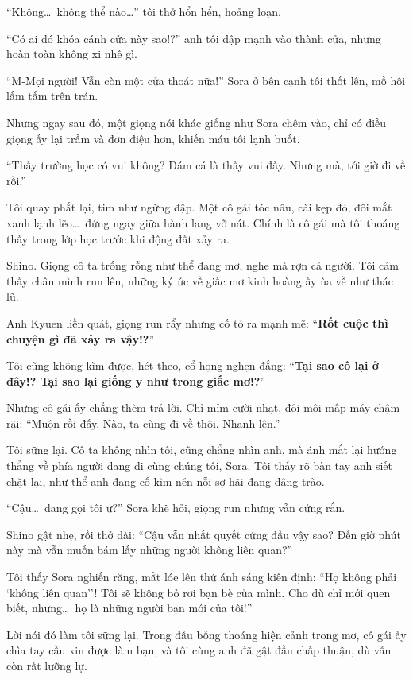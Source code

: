 \documentclass[../main.tex]{subfiles}
\begin{document}
``Không\dots\ không thể nào\dots'' tôi thở hổn hển, hoảng loạn.

``Có ai đó khóa cánh cửa này sao!?'' anh tôi đập mạnh vào thành cửa, nhưng hoàn toàn không xi nhê gì.

``M-Mọi người! Vẫn còn một cửa thoát nữa!'' Sora ở bên cạnh tôi thốt lên, mồ hôi lấm tấm trên trán.

Nhưng ngay sau đó, một giọng nói khác giống như Sora chêm vào, chỉ có điều giọng ấy lại trầm và đơn điệu hơn, khiến máu tôi lạnh buốt.


``Thấy trường học có vui không? Dám cá là thấy vui đấy. Nhưng mà, tới giờ đi về rồi.''

Tôi quay phắt lại, tim như ngừng đập. Một cô gái tóc nâu, cài kẹp đỏ, đôi mắt xanh lạnh lẽo\dots\ đứng ngay giữa hành lang vỡ nát. Chính là cô gái mà tôi thoáng thấy trong lớp học trước khi động đất xảy ra.

Shino. Giọng cô ta trống rỗng như thể đang mơ, nghe mà rợn cả người. Tôi cảm thấy chân mình run lên, những ký ức về giấc mơ kinh hoàng ấy ùa về như thác lũ.

Anh Kyuen liền quát, giọng run rẩy nhưng cố tỏ ra mạnh mẽ: ``\textbf{Rốt cuộc thì chuyện gì đã xảy ra vậy!?}''

Tôi cũng không kìm được, hét theo, cổ họng nghẹn đắng: ``\textbf{Tại sao cô lại ở đây!? Tại sao lại giống y như trong giấc mơ!?}''

Nhưng cô gái ấy chẳng thèm trả lời. Chỉ mỉm cười nhạt, đôi môi mấp máy chậm rãi: ``Muộn rồi đấy. Nào, ta cùng đi về thôi. Nhanh lên.''

Tôi sững lại. Cô ta không nhìn tôi, cũng chẳng nhìn anh, mà ánh mắt lại hướng thẳng về phía người đang đi cùng chúng tôi, Sora. Tôi thấy rõ bàn tay anh siết chặt lại, như thể anh đang cố kìm nén nỗi sợ hãi đang dâng trào.

``Cậu\dots\ đang gọi tôi ư?'' Sora khẽ hỏi, giọng run nhưng vẫn cứng rắn.

Shino gật nhẹ, rồi thở dài: ``Cậu vẫn nhất quyết cứng đầu vậy sao? Đến giờ phút này mà vẫn muốn bám lấy những người không liên quan?''

Tôi thấy Sora nghiến răng, mắt lóe lên thứ ánh sáng kiên định: ``Họ không phải `không liên quan''! Tôi sẽ không bỏ rơi bạn bè của mình. Cho dù chỉ mới quen biết, nhưng\dots\ họ là những người bạn mới của tôi!''

Lời nói đó làm tôi sững lại. Trong đầu bỗng thoáng hiện cảnh trong mơ, cô gái ấy chìa tay cầu xin được làm bạn, và tôi cùng anh đã gật đầu chấp thuận, dù vẫn còn rất lưỡng lự.
\end{document}
